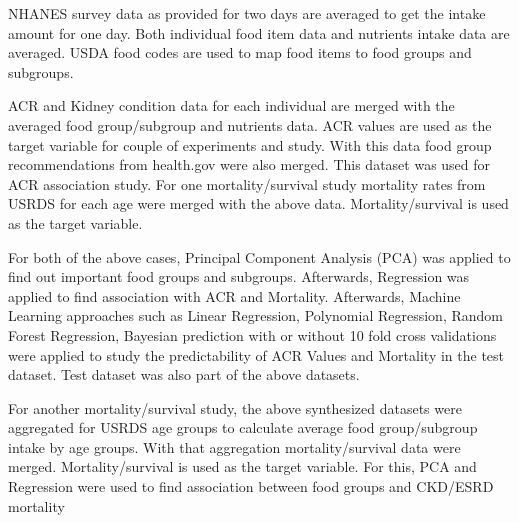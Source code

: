 \noindent NHANES survey data as provided for two days are averaged to get the intake amount for one day. Both individual food item data and nutrients intake data are averaged. USDA food codes are used to map food items to food groups and subgroups.

\medskip 
\noindent ACR and Kidney condition data for each individual are merged with the averaged food group/subgroup and nutrients data. ACR values are used as the target variable for couple of experiments and study. With this data food group recommendations from health.gov were also merged. This dataset was used for ACR association study. For one mortality/survival study mortality rates from USRDS for each age were merged with the above data. Mortality/survival is used as the target variable.

\medskip 
\noindent For both of the above cases, Principal Component Analysis (PCA) was applied to find out important food groups and subgroups. Afterwards, Regression was applied to find association with ACR and Mortality. Afterwards, Machine Learning approaches such as Linear Regression, Polynomial Regression, Random Forest Regression, Bayesian prediction with or without 10 fold cross validations were applied to study the predictability of ACR Values and Mortality in the test dataset. Test dataset was also part of the above datasets.

\medskip
\noindent For another mortality/survival study, the above synthesized datasets were aggregated for USRDS age groups to calculate average food group/subgroup intake by age groups. With that aggregation mortality/survival data were merged. Mortality/survival is used as the target variable. For this, PCA and Regression were used to find association between food groups and CKD/ESRD mortality
